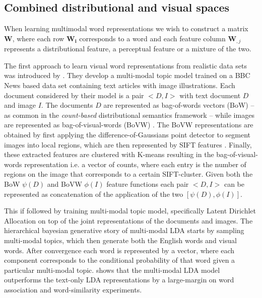 \subsection{Combined distributional and visual spaces}
\label{sec:distvis}

When learning multimodal word representations we wish to construct a matrix $\mathbf{W}$, 
where each row $\mathbf{W_i}$
corresponds to a word and each feature column $\mathbf{W}_{,j}$ 
represents a distributional feature, a perceptual feature or a mixture of the two.

The first approach to learn visual word representations from realistic data sets
was introduced by \cite{feng2010visual}. They develop a multi-modal topic model trained on a
BBC News based data set containing text articles with image illustrations.
Each document considered by their model
is a pair $<D, I>$ with text document $D$ and image $I$.
The documents $D$ are represented as bag-of-words vectors (BoW) -- as common in the
\emph{count-based} distributional semantics framework -- while images are represented
as bag-of-visual-words (BoVW)  \citep{csurka2004visual}.  The BoVW representations are
obtained by first applying the difference-of-Gaussians point detector to segment images
into local regions, which are then represented by SIFT features \citep{lowe1999object}.
Finally, these extracted features are clustered with K-means resulting in the
bag-of-visual-words  representation i.e.
a vector of counts, where each entry is the number of regions on the image that
corresponds to a certain SIFT-cluster.  Given both the BoW  $\psi(D)$ and
BoVW $\phi(I)$ feature functions each pair $<D, I>$ can be represented as concatenation
of the application of the two $[\psi(D), \phi(I)]$.

 This if followed by training multi-modal
 topic model, specifically Latent Dirichlet Allocation \citep{blei2003latent}
on top of the joint representations of the documents and images.
The hierarchical bayesian generative story of multi-modal LDA  starts by sampling multi-modal topics,
which then generate both the English words and visual words.
After convergence each word is represented by a vector,
where each component corresponds to the conditional probability of that word given 
a particular multi-modal topic. \cite{feng2010visual}
shows that the multi-modal LDA model outperforms the text-only LDA representations by a
large-margin on word association and word-similarity experiments.

